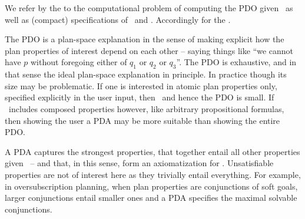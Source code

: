 We refer by the  to the computational problem of
computing the PDO given \task\ as well as (compact) specifications of
\plans\ and \props. Accordingly for the .

The PDO is a plan-space explanation in the sense of making explicit
how the plan properties of interest depend on each other -- saying
things like ``we cannot have $p$ without foregoing either of $q_1$ or
$q_2$ or $q_3$''. The PDO is exhaustive, and in that sense the ideal
plan-space explanation in principle. In practice though its size may
be problematic. If one is interested in atomic plan properties only,
specified explicitly in the user input, then \props\ and hence the PDO
is small. If \props\ includes composed properties however, like
arbitrary propositional formulas, then showing the user a PDA may be
more suitable than showing the entire PDO.

A PDA captures the strongest properties, that together entail all
other properties given \plans\ -- and that, in this sense, form an
axiomatization for \plans. Unsatisfiable properties are not of
interest here as they trivially entail everything. For example, in
oversubscription planning, when plan properties are conjunctions of
soft goals, larger conjunctions entail smaller ones and a PDA
specifies the maximal solvable conjunctions.

%


